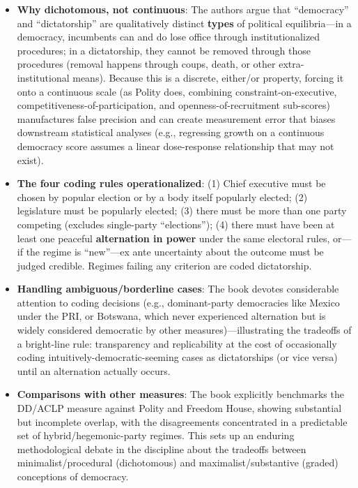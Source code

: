 \documentclass[12pt]{article}
\begin{document}
\begin{itemize}[leftmargin=*, itemsep=4pt]
    \item \textbf{Why dichotomous, not continuous}: The authors argue that ``democracy'' and ``dictatorship'' are qualitatively distinct \textbf{types} of political equilibria---in a democracy, incumbents can and do lose office through institutionalized procedures; in a dictatorship, they cannot be removed through those procedures (removal happens through coups, death, or other extra-institutional means). Because this is a discrete, either/or property, forcing it onto a continuous scale (as Polity does, combining constraint-on-executive, competitiveness-of-participation, and openness-of-recruitment sub-scores) manufactures false precision and can create measurement error that biases downstream statistical analyses (e.g., regressing growth on a continuous democracy score assumes a linear dose-response relationship that may not exist).
    \item \textbf{The four coding rules operationalized}: (1) Chief executive must be chosen by popular election or by a body itself popularly elected; (2) legislature must be popularly elected; (3) there must be more than one party competing (excludes single-party ``elections''); (4) there must have been at least one peaceful \textbf{alternation in power} under the same electoral rules, or---if the regime is ``new''---ex ante uncertainty about the outcome must be judged credible. Regimes failing any criterion are coded dictatorship.
    \item \textbf{Handling ambiguous/borderline cases}: The book devotes considerable attention to coding decisions (e.g., dominant-party democracies like Mexico under the PRI, or Botswana, which never experienced alternation but is widely considered democratic by other measures)---illustrating the tradeoffs of a bright-line rule: transparency and replicability at the cost of occasionally coding intuitively-democratic-seeming cases as dictatorships (or vice versa) until an alternation actually occurs.
    \item \textbf{Comparisons with other measures}: The book explicitly benchmarks the DD/ACLP measure against Polity and Freedom House, showing substantial but incomplete overlap, with the disagreements concentrated in a predictable set of hybrid/hegemonic-party regimes. This sets up an enduring methodological debate in the discipline about the tradeoffs between minimalist/procedural (dichotomous) and maximalist/substantive (graded) conceptions of democracy.

\end{itemize}
\end{document}
